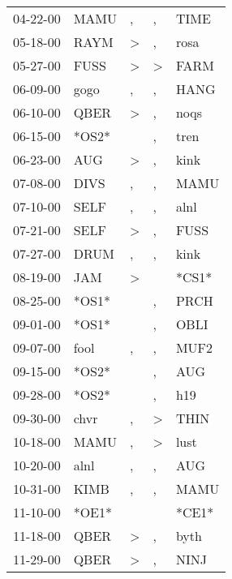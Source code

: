 \begin{supertabular}{lllll}
 04-22-00 &   MAMU &                , &                , &   TIME \\
 05-18-00 &   RAYM &     \textgreater &                , &   rosa \\
 05-27-00 &   FUSS &     \textgreater &     \textgreater &   FARM \\
 06-09-00 &   gogo &                , &                , &   HANG \\
 06-10-00 &   QBER &     \textgreater &                , &   noqs \\
 06-15-00 &  *OS2* &                  &                , &   tren \\
 06-23-00 &    AUG &     \textgreater &                , &   kink \\
 07-08-00 &   DIVS &                , &                , &   MAMU \\
 07-10-00 &   SELF &                , &                , &   alnl \\
 07-21-00 &   SELF &     \textgreater &                , &   FUSS \\
 07-27-00 &   DRUM &                , &                , &   kink \\
 08-19-00 &    JAM &     \textgreater &                  &  *CS1* \\
 08-25-00 &  *OS1* &                  &                , &   PRCH \\
 09-01-00 &  *OS1* &                  &                , &   OBLI \\
 09-07-00 &   fool &                , &                , &   MUF2 \\
 09-15-00 &  *OS2* &                  &                , &    AUG \\
 09-28-00 &  *OS2* &                  &                , &    h19 \\
 09-30-00 &   chvr &                , &     \textgreater &   THIN \\
 10-18-00 &   MAMU &                , &     \textgreater &   lust \\
 10-20-00 &   alnl &                , &                , &    AUG \\
 10-31-00 &   KIMB &                , &                , &   MAMU \\
 11-10-00 &  *OE1* &                  &                  &  *CE1* \\
 11-18-00 &   QBER &     \textgreater &                , &   byth \\
 11-29-00 &   QBER &     \textgreater &                , &   NINJ \\

\end{supertabular}

